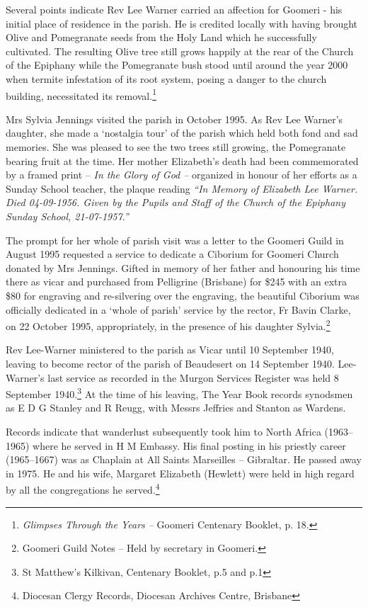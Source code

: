 Several points indicate Rev Lee Warner carried an affection for Goomeri - his initial place of residence in the parish. He is credited locally with having brought Olive and Pomegranate seeds from the Holy Land which he successfully cultivated. The resulting Olive tree still grows happily at the rear of the Church of the Epiphany while the Pomegranate bush stood until around the year 2000 when termite infestation of its root system, posing a danger to the church building, necessitated its removal.\footnote{\emph{Glimpses Through the Years --} Goomeri Centenary Booklet, p. 18.}

Mrs Sylvia Jennings visited the parish in October 1995. As Rev Lee Warner's daughter, she made a `nostalgia tour' of the parish which held both fond and sad memories. She was pleased to see the two trees still growing, the Pomegranate bearing fruit at the time. Her mother Elizabeth's death had been commemorated by a framed print -- \emph{In the Glory of God --} organized in honour of her efforts as a Sunday School teacher, the plaque reading \emph{``In Memory of Elizabeth Lee Warner. Died 04-09-1956. Given by the Pupils and Staff of the Church of the Epiphany Sunday School, 21-07-1957.''}

The prompt for her whole of parish visit was a letter to the Goomeri Guild in August 1995 requested a service to dedicate a Ciborium for Goomeri Church donated by Mrs Jennings. Gifted in memory of her father and honouring his time there as vicar and purchased from Pelligrine (Brisbane) for \$245 with an extra \$80 for engraving and re-silvering over the engraving, the beautiful Ciborium was officially dedicated in a `whole of parish' service by the rector, Fr Bavin Clarke, on 22 October 1995, appropriately, in the presence of his daughter Sylvia.\footnote{Goomeri Guild Notes -- Held by secretary in Goomeri.}

Rev Lee-Warner ministered to the parish as Vicar until 10 September 1940, leaving to become rector of the parish of Beaudesert on 14 September 1940. Lee-Warner's last service as recorded in the Murgon Services Register was held 8 September 1940.\footnote{St Matthew's Kilkivan, Centenary Booklet, p.5 and p.1} At the time of his leaving, The Year Book records synodsmen as E D G Stanley and R Reugg, with Messrs Jeffries and Stanton as Wardens.

Records indicate that wanderlust subsequently took him to North Africa (1963--1965) where he served in H M Embassy. His final posting in his priestly career (1965--1667) was as Chaplain at All Saints Marseilles -- Gibraltar. He passed away in 1975. He and his wife, Margaret Elizabeth (Hewlett) were held in high regard by all the congregations he served.\footnote{Diocesan Clergy Records, Diocesan Archives Centre, Brisbane}

